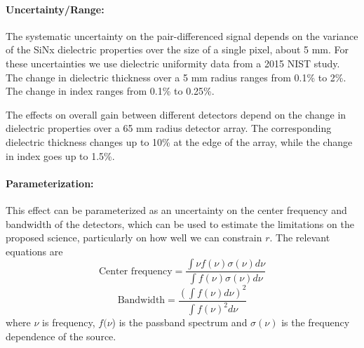 \paragraph{Uncertainty/Range:}
The systematic uncertainty on the pair-differenced signal depends on the variance of the SiNx dielectric properties over the size of a single pixel, about 5 mm. For these uncertainties we use dielectric uniformity data from a 2015 NIST study. The change in dielectric thickness over a 5 mm radius ranges from 0.1\% to 2\%. The change in index ranges from 0.1\% to 0.25\%.

The effects on overall gain between different detectors depend on the change in dielectric properties over a 65 mm radius detector array. The corresponding dielectric thickness changes up to 10\% at the edge of the array, while the change in index goes up to 1.5\%.

\paragraph{Parameterization:}
This effect can be parameterized as an uncertainty on the center frequency and bandwidth of the detectors, which can be used to estimate the limitations on the proposed science, particularly on how well we can constrain $r$. The relevant equations are
\begin{equation}
\textrm{Center frequency} = \frac{\int \nu f(\nu) \sigma(\nu) d\nu}{\int f(\nu) \sigma(\nu) d\nu}
\end{equation}
\begin{equation}
\textrm{Bandwidth} = \frac{(\int f(\nu) d\nu)^2}{\int f(\nu) ^2 d\nu}
\end{equation}
where $\nu$ is frequency, $f(\nu$) is the passband spectrum and $\sigma (\nu)$ is the frequency dependence of the source.
